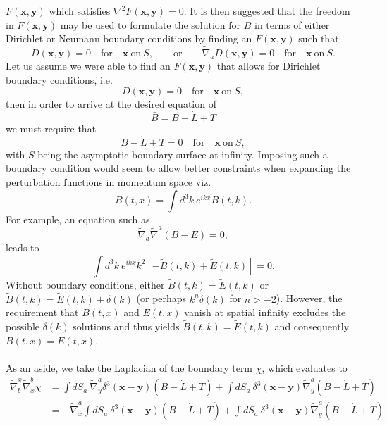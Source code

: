 \documentclass[10pt,letterpaper]{article}
\numberwithin{equation}{subsection}
\begin{document}
$F(\mathbf x, \mathbf y)$ which satisfies $\nabla^2 F(\mathbf x, \mathbf y) = 0$. It is then suggested that the freedom in $F(\mathbf x, \mathbf y)$ may be used to formulate the solution for $\bar B$ in terms of either Dirichlet or Neumann boundary conditions by finding an $F(\mathbf x, \mathbf y)$ such that
\begin{equation}
D(\mathbf x, \mathbf y) = 0\quad\text{for}\quad \mathbf x\ \text{on}\ S,\qquad \text{or}\qquad \tilde\nabla_a D(\mathbf x, \mathbf y) = 0\quad\text{for}\quad \mathbf x\ \text{on}\ S.
\end{equation}
Let us assume we were able to find an $F(\mathbf x,\mathbf y)$ that allows for Dirichlet boundary conditions, i.e.
\begin{equation}
D(\mathbf x, \mathbf y) = 0\quad\text{for}\quad \mathbf x\ \text{on}\ S,
\end{equation}
then in order to arrive at the desired equation of
\begin{equation}
\bar B = B - \dot L + T
\end{equation}
we must require that 
\begin{equation}
B - \dot L + T = 0\quad\text{for}\quad \mathbf x\ \text{on}\ S,
\end{equation}
with $S$ being the asymptotic boundary surface at infinity. Imposing such a boundary condition would seem to allow better constraints when expanding the perturbation functions in momentum space viz.
\begin{equation}
B(t,x) = \int d^3k\ e^{ikx} \tilde B(t,k).
\end{equation}
For example, an equation such as
\begin{equation}
\tilde\nabla_a \tilde\nabla^a (B-E) = 0,
\end{equation}
leads to
\begin{equation}
\int d^3k\ e^{ikx} k^2 [-\tilde B(t,k)+\tilde E(t,k)] = 0.
\end{equation}
Without boundary conditions, either $\tilde B(t,k) = \tilde E(t,k)$ or $\tilde B(t,k)=\tilde E(t,k)+\delta(k)$ (or perhaps $k^n \delta(k)$ for $n>-2$). However, the requirement that $B(t,x)$ and $E(t,x)$ vanish at spatial infinity excludes the possible $\delta(k)$ solutions and thus yields $\tilde B(t,k) = \tilde E(t,k)$ and consequently $B(t,x) = E(t,x)$.
\\ \\
As an aside, we take the Laplacian of the boundary term $\chi$, which evaluates to
\begin{align}
\tilde\nabla_b^x\tilde\nabla^b_x \chi &=  \int dS_a\   \tilde\nabla^a_y \delta^3(\mathbf x - \mathbf y)(B-\dot L + T) + \int dS_a\  \delta^3(\mathbf x - \mathbf y)\tilde\nabla^a_y(B-\dot L + T)
\nonumber \\
&= -\tilde\nabla^a_x \int dS_a\ \delta^3(\mathbf x- \mathbf y)(B-\dot L + T)+ \int dS_a\  \delta^3(\mathbf x - \mathbf y)\tilde\nabla^a_y(B-\dot L + T)
\end{align}
\end{document}

